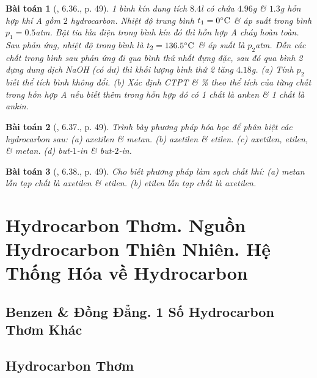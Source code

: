\documentclass{article}
\newtheorem{baitoan}{Bài toán}
\begin{document}
\begin{baitoan}[\cite{SBT_Hoa_Hoc_11_co_ban}, 6.36., p. 49]
	1 bình kín dung tích $8.4$\emph{l} có chứa $4.96$\emph{g } \& $1.3$\emph{g} hỗn hợp khí A gồm $2$ hydrocarbon. Nhiệt độ trung bình $t_1 = 0^\circ{\rm C}$ \& áp suất trong bình $p_1 = 0.5$\emph{atm}. Bật tia lửa điện trong bình kín đó thì hỗn hợp A cháy hoàn toàn. Sau phản ứng, nhiệt độ trong bình là $t_2 = 136.5^\circ{\rm C}$ \& áp suất là $p_2$\emph{atm}. Dẫn các chất trong bình sau phản ứng đi qua bình thứ nhất đựng \emph{} đặc, sau đó qua bình 2 đựng dung dịch \emph{NaOH} (có dư) thì khối lượng bình thứ 2 tăng $4.18$\emph{g}. (a) Tính $p_2$ biết thể tích bình không đổi. (b) Xác định CTPT \& \% theo thể tích của từng chất trong hỗn hợp A nếu biết thêm trong hỗn hợp đó có 1 chất là anken \& 1 chất là ankin.
\end{baitoan}

\begin{baitoan}[\cite{SBT_Hoa_Hoc_11_co_ban}, 6.37., p. 49]
	Trình bày phương pháp hóa học để phân biệt các hydrocarbon sau: (a) axetilen \& metan. (b) axetilen \& etilen. (c) axetilen, etilen, \& metan. (d) but-$1$-in \& but-$2$-in.
\end{baitoan}

\begin{baitoan}[\cite{SBT_Hoa_Hoc_11_co_ban}, 6.38., p. 49]
	Cho biết phương pháp làm sạch chất khí: (a) metan lẫn tạp chất là axetilen \& etilen. (b) etilen lẫn tạp chất là axetilen.
\end{baitoan}


\section{Hydrocarbon Thơm. Nguồn Hydrocarbon Thiên Nhiên. Hệ Thống Hóa về Hydrocarbon}

\subsection{Benzen \& Đồng Đẳng. 1 Số Hydrocarbon Thơm Khác}


\subsection{Hydrocarbon Thơm}
\end{document}
